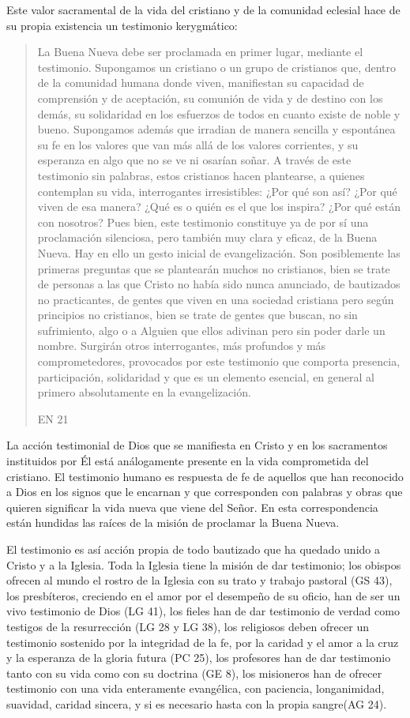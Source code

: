 Este valor sacramental de la vida del cristiano y de la comunidad eclesial hace
de su propia existencia un testimonio kerygmático:
\blockquote[EN 21]{La Buena Nueva debe ser proclamada en primer lugar, mediante
  el testimonio. Supongamos un cristiano o un grupo de cristianos que, dentro de
  la comunidad humana donde viven, manifiestan su capacidad de comprensión y de
  aceptación, su comunión de vida y de destino con los demás, su solidaridad en
  los esfuerzos de todos en cuanto existe de noble y bueno. Supongamos además
  que irradian de manera sencilla y espontánea su fe en los valores que van más
  allá de los valores corrientes, y su esperanza en algo que no se ve ni osarían
  soñar. A través de este testimonio sin palabras, estos cristianos hacen
  plantearse, a quienes contemplan su vida, interrogantes irresistibles: ¿Por
  qué son así? ¿Por qué viven de esa manera? ¿Qué es o quién es el que los
  inspira? ¿Por qué están con nosotros? Pues bien, este testimonio constituye ya
  de por sí una proclamación silenciosa, pero también muy clara y eficaz, de la
  Buena Nueva. Hay en ello un gesto inicial de evangelización. Son posiblemente
  las primeras preguntas que se plantearán muchos no cristianos, bien se trate
  de personas a las que Cristo no había sido nunca anunciado, de bautizados no
  practicantes, de gentes que viven en una sociedad cristiana pero según
  principios no cristianos, bien se trate de gentes que buscan, no sin
  sufrimiento, algo o a Alguien que ellos adivinan pero sin poder darle un
  nombre. Surgirán otros interrogantes, más profundos y más comprometedores,
  provocados por este testimonio que comporta presencia, participación,
  solidaridad y que es un elemento esencial, en general al primero absolutamente
  en la evangelización.}
La acción testimonial de Dios que se manifiesta en Cristo y en los sacramentos
instituidos por Él está análogamente presente en la vida comprometida del
cristiano. El testimonio humano es respuesta de fe de aquellos que han
reconocido a Dios en los signos que le encarnan y que corresponden con palabras
y obras que quieren significar la vida nueva que viene del Señor. En esta
correspondencia están hundidas las raíces de la misión de proclamar la Buena
Nueva.

El testimonio es así acción propia de todo bautizado que ha quedado unido a
Cristo y a la Iglesia.\autocite[Cf.][188]{prades2015testimonio} Toda la Iglesia
tiene la misión de dar testimonio; los obispos ofrecen al mundo el rostro de la
Iglesia con su trato y trabajo pastoral (GS 43), los presbíteros, creciendo en
el amor por el desempeño de su oficio, han de ser un vivo testimonio de Dios (LG
41), los fieles han de dar testimonio de verdad como testigos de la resurrección
(LG 28 y LG 38), los religiosos deben ofrecer un testimonio sostenido por la
integridad de la fe, por la caridad y el amor a la cruz y la esperanza de la
gloria futura (PC 25), los profesores han de dar testimonio tanto con su vida
como con su doctrina (GE 8), los misioneros han de ofrecer testimonio con una
vida enteramente evangélica, con paciencia, longanimidad, suavidad, caridad
sincera, y si es necesario hasta con la propia sangre(AG 24).

